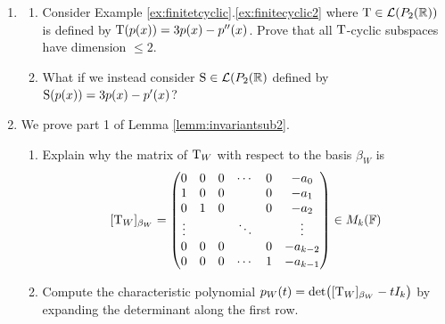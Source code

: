 \begin{exercises}
\begin{enumerate}
		
		\item\begin{enumerate}
		  \item Consider Example \ref*{ex:finitetcyclic}.\ref{ex:finitecyclic2} where $\mathrm{T}\in\mathcal{L}(P_2(\mathbb{R}))$ is defined by $\mathrm{T}(p(x))=3p(x)-p''(x)$. Prove that all $\mathrm{T}$-cyclic subspaces have dimension $\le 2$.
		  \item What if we instead consider $\mathrm{S}\in\mathcal{L}(P_2(\mathbb{R})$ defined by $\mathrm{S}(p(x))=3p(x)-p'(x)$?
		\end{enumerate}
	  
	  
	  \item We prove part 1 of Lemma \ref{lemm:invariantsub2}.
	  \begin{enumerate}
	    \item Explain why the matrix of $\mathrm{T}_W$ with respect to the basis $\beta_W$ is
	    \[
	    	[\mathrm{T}_W]_{\beta_W}=
	    	\begin{pmatrix}
			 		0&0&0&\cdots&0&-a_0\\
			 		1&0&0&&0&-a_1\\
			 		0&1&0&&0&-a_2\\
			 		\vdots&&&\ddots&&\vdots\\
					0&0&0&&0&-a_{k-2}\\
			 		0&0&0&\cdots&1&-a_{k-1}
			 	\end{pmatrix}
			 	\in M_k(\mathbb{F})
			 \]
	 		\item Compute the characteristic polynomial $p_W(t)=\det\bigl([\mathrm{T}_{W}]_{\beta_W}-tI_k\bigr)$ by expanding the determinant along the first row.
		\end{enumerate}
	\end{enumerate}
\end{exercises}

